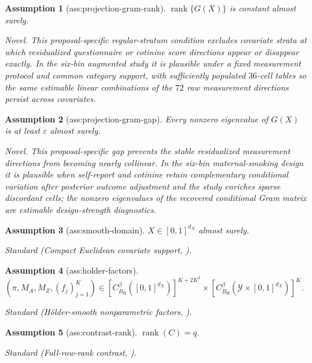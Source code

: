 \documentclass{article}
\newtheorem{assumption}{Assumption}
\begin{document}
\begin{assumption}[ass:projection-gram-rank]\label{ass:projection-gram-rank}
\(\operatorname{rank}\{G(X)\}\) is constant almost surely.
\par\smallskip\noindent\emph{Novel.} This proposal-specific regular-stratum condition excludes covariate strata at which residualized questionnaire or cotinine score directions appear or disappear exactly. In the six-bin augmented study it is plausible under a fixed measurement protocol and common category support, with sufficiently populated \(36\)-cell tables so the same estimable linear combinations of the \(72\) raw measurement directions persist across covariates.
\end{assumption}

\begin{assumption}[ass:projection-gram-gap]\label{ass:projection-gram-gap}
Every nonzero eigenvalue of \(G(X)\) is at least \(\varepsilon\) almost surely.
\par\smallskip\noindent\emph{Novel.} This proposal-specific gap prevents the stable residualized measurement directions from becoming nearly collinear. In the six-bin maternal-smoking design it is plausible when self-report and cotinine retain complementary conditional variation after posterior outcome adjustment and the study enriches sparse discordant cells; the nonzero eigenvalues of the recovered conditional Gram matrix are estimable design-strength diagnostics.
\end{assumption}

\begin{assumption}[ass:smooth-domain]\label{ass:smooth-domain}
\(X\in[0,1]^{d_X}\) almost surely.
\par\smallskip\noindent\emph{Standard} (Compact Euclidean covariate support, \cite{Tsybakov2009}).
\end{assumption}

\begin{assumption}[ass:holder-factors]\label{ass:holder-factors}
\((\pi,M_A,M_Z,(f_j)_{j=1}^{K})\in[C^{\beta}_{B_{\mathrm H}}([0,1]^{d_X})]^{K+2K^{2}}\times[C^{\beta}_{B_{\mathrm H}}(\mathcal Y\times[0,1]^{d_X})]^{K}\).
\par\smallskip\noindent\emph{Standard} (H\"older-smooth nonparametric factors, \cite{Tsybakov2009}).
\end{assumption}

\begin{assumption}[ass:contrast-rank]\label{ass:contrast-rank}
\(\operatorname{rank}(C)=q\).
\par\smallskip\noindent\emph{Standard} (Full-row-rank contrast, \cite{ZhouTchetgenTchetgen2026}).
\end{assumption}
\end{document}
